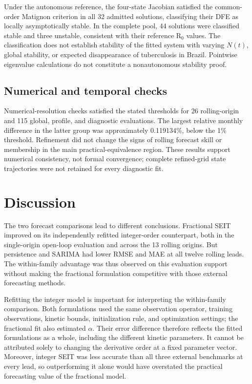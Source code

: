 \documentclass[pdflatex,sn-mathphys-ay]{sn-jnl}
\begin{document}
Under the autonomous reference, the four-state Jacobian satisfied the common-order Matignon criterion in all 32 admitted solutions, classifying their DFE as locally asymptotically stable. In the complete pool, 44 solutions were classified stable and three unstable, consistent with their reference R$_0$ values. The classification does not establish stability of the fitted system with varying $N(t)$, global stability, or expected disappearance of tuberculosis in Brazil. Pointwise eigenvalue calculations do not constitute a nonautonomous stability proof.

\subsection{Numerical and temporal checks}

Numerical-resolution checks satisfied the stated thresholds for 26 rolling-origin and 115 global, profile, and diagnostic evaluations. The largest relative monthly difference in the latter group was approximately 0.119134\%, below the 1\% threshold. Refinement did not change the signs of rolling forecast skill or membership in the main practical-equivalence region. These results support numerical consistency, not formal convergence; complete refined-grid state trajectories were not retained for every diagnostic fit.

\section{Discussion}

The two forecast comparisons lead to different conclusions. Fractional SEIT improved on its independently refitted integer-order counterpart, both in the single-origin open-loop evaluation and across the 13 rolling origins. But persistence and SARIMA had lower RMSE and MAE at all twelve rolling leads. The within-family advantage was thus observed on this evaluation support without making the fractional formulation competitive with those external forecasting methods.

Refitting the integer model is important for interpreting the within-family comparison. Both formulations used the same observation operator, training observations, kinetic bounds, initialization rule, and optimization settings; the fractional fit also estimated $\alpha$. Their error difference therefore reflects the fitted formulations as a whole, including the different kinetic parameters. It cannot be attributed solely to changing the derivative order at a fixed parameter vector. Moreover, integer SEIT was less accurate than all three external benchmarks at every lead, so outperforming it alone would have overstated the practical forecasting value of the fractional model.
\end{document}
